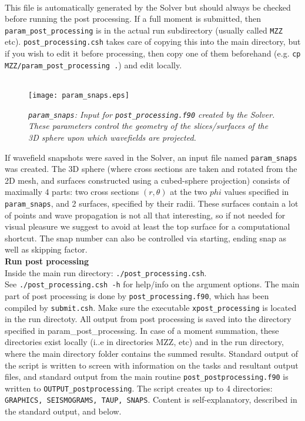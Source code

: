 \documentclass[11pt,letter,fleqn,english,notitlepage]{article}
\begin{document}
\\
This file is automatically generated by the Solver but should always be checked before running the post processing. 
If a full moment is submitted, then {\tt param\_post\_processing} is in the actual run subdirectory (usually called {\tt MZZ} etc). 
{\tt post\_processing.csh} takes care of copying this into the main directory, 
but if you wish to edit it before processing, then copy one of them beforehand 
(e.g. {\tt cp MZZ/param\_post\_processing .}) and edit locally.\\

\\
\begin{figure*}[htb]
\begin{center}
\texttt{[image: param\_snaps.eps]}
\caption{\textit{{\tt param\_snaps}: Input for {\tt post\_processing.f90} created by the Solver. These parameters 
control the geometry of the slices/surfaces of the 3D sphere upon which wavefields are projected.  }}
\end{center}
\end{figure*}

\noindent 
If wavefield snapshots were saved in the Solver, an input file named {\tt param\_snaps} was created.
The 3D sphere (where cross sections are taken and rotated from the 2D mesh, and surfaces constructed 
using a cubed-sphere projection) consists of maximally 4 parts: 
two cross sections $(r,\theta)$ at the two $phi$ values specified in {\tt param\_snaps}, 
and 2 surfaces, specified by their radii. These surfaces contain a lot of points and wave propagation is not 
all that interesting, so if not needed for visual pleasure we suggest to avoid at least the top surface for a computational
shortcut. The snap number can also be controlled via starting, ending snap as well as skipping factor. \\

\noindent \textbf{Run post processing}\\
Inside the main run directory: {\tt ./post\_processing.csh}.\\ See {\tt ./post\_processing.csh -h} for help/info on the 
argument options. The main part of post processing is done by {\tt post\_processing.f90}, which 
has been compiled by {\tt submit.csh}. Make sure the executable {\tt xpost\_processing} is located in the run directoty.
All output from post processing is saved into the directory specified in param\_post\_processing. 
In case of a moment summation, these directories exist locally (i..e in directories MZZ, etc) and in the run directory, where 
the main directory folder contains the summed results. Standard output of the script is written to screen with information 
on the tasks and resultant output files, and standard output from the main routine {\tt post\_postprocessing.f90} is 
written to {\tt OUTPUT\_postprocessing}. The script creates up to 4 directories: 
{\tt GRAPHICS, SEISMOGRAMS, TAUP, SNAPS}. 
Content is self-explanatory, described in the standard output, and below.
\newpage
\end{document}
